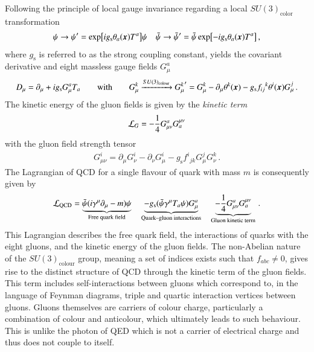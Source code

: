 Following the principle of local gauge invariance regarding a local
$SU(3)_{\text{color}}$ transformation
\begin{align*}
  \psi \to \psi^\prime = \exp[ i g_{\text{s}} \theta_a(\myvec{x}) T^a] \psi
  &&\bar{\psi} \to \bar{\psi}^\prime = \bar{\psi} \exp[ - i g_{\text{s}} \theta_a(\myvec{x}) T^a]  \,\text{,}
\end{align*}
where $g_{\text{s}}$ is referred to as the strong coupling constant, yields the
covariant derivative and eight massless gauge fields $G_\mu^a$
\begin{align*}
  D_\mu = \partial_\mu + i g_{\text{s}} G_\mu^a T_a
  \qquad \text{with} \qquad
  G_\mu^k \xrightarrow{SU(3)_{\text{colour}}} {G_\mu^k}^\prime = G_\mu^k  - \partial_\mu \theta^k(\myvec{x}) - g_{\text{s}} {f_{ij}}^k \theta^i(\myvec{x}) G_\mu^j \,\text{.}
\end{align*}
The kinetic energy of the gluon fields is given by the \emph{kinetic term}
\begin{align*}
  \mathcal{L}_{G} = - \frac{1}{4} G_{\mu\nu}^{a} G^{\mu\nu}_{a}
\end{align*}
with the gluon field strength tensor
\begin{align*}
  G_{\mu\nu}^i = \partial_\mu G_\nu^i - \partial_\nu G_\mu^i - g_{\text{s}} {f^{i}}_{jk} G_\mu^j G_\nu ^k \,\text{.}
\end{align*}
The Lagrangian of QCD for a single flavour of quark with mass $m$ is
consequently given by
\begin{align*}
  \mathcal{L}_{\text{QCD}} =
  \underbrace{\bar{\psi} (i \gamma^\mu \partial_\mu - m) \psi}_{\text{Free quark field}}
  \hspace*{1em}
  \underbrace{- g_{\text{s}} (\bar{\psi} \gamma^\mu T_a \psi) G_\mu^a}_{\text{Quark--gluon interactions}}
  \hspace*{1em}
  \underbrace{- \frac{1}{4} G_{\mu\nu}^a G^{\mu\nu}_a}_{\text{Gluon kinetic term}} \,\text{.}
\end{align*}
This Lagrangian describes the free quark field, the interactions of quarks with
the eight gluons, and the kinetic energy of the gluon fields. The non-Abelian
nature of the $SU(3)_{\text{colour}}$ group, meaning a set of indices exists
such that $f_{abc} \neq 0$, gives rise to the distinct structure of QCD through
the kinetic term of the gluon fields. This term includes self-interactions
between gluons which correspond to, in the language of Feynman diagrams, triple
and quartic interaction vertices between gluons. Gluons themselves are carriers
of colour charge, particularly a combination of colour and anticolour, which
ultimately leads to such behaviour. This is unlike the photon of QED which is
not a carrier of electrical charge and thus does not couple to itself.

